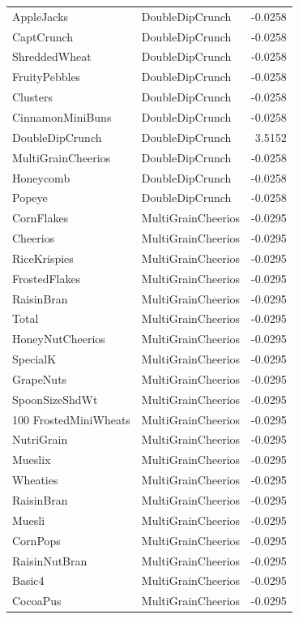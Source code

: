 \begin{longtable}{llr}
AppleJacks & DoubleDipCrunch & -0.0258 \\
CaptCrunch & DoubleDipCrunch & -0.0258 \\
ShreddedWheat & DoubleDipCrunch & -0.0258 \\
FruityPebbles & DoubleDipCrunch & -0.0258 \\
Clusters & DoubleDipCrunch & -0.0258 \\
CinnamonMiniBuns & DoubleDipCrunch & -0.0258 \\
DoubleDipCrunch & DoubleDipCrunch & 3.5152 \\
MultiGrainCheerios & DoubleDipCrunch & -0.0258 \\
Honeycomb & DoubleDipCrunch & -0.0258 \\
Popeye & DoubleDipCrunch & -0.0258 \\
CornFlakes & MultiGrainCheerios & -0.0295 \\
Cheerios & MultiGrainCheerios & -0.0295 \\
RiceKrispies & MultiGrainCheerios & -0.0295 \\
FrostedFlakes & MultiGrainCheerios & -0.0295 \\
RaisinBran & MultiGrainCheerios & -0.0295 \\
Total & MultiGrainCheerios & -0.0295 \\
HoneyNutCheerios & MultiGrainCheerios & -0.0295 \\
SpecialK & MultiGrainCheerios & -0.0295 \\
GrapeNuts & MultiGrainCheerios & -0.0295 \\
SpoonSizeShdWt & MultiGrainCheerios & -0.0295 \\
100%
FrostedMiniWheats & MultiGrainCheerios & -0.0295 \\
NutriGrain & MultiGrainCheerios & -0.0295 \\
Mueslix & MultiGrainCheerios & -0.0295 \\
Wheaties & MultiGrainCheerios & -0.0295 \\
RaisinBran & MultiGrainCheerios & -0.0295 \\
Muesli & MultiGrainCheerios & -0.0295 \\
CornPops & MultiGrainCheerios & -0.0295 \\
RaisinNutBran & MultiGrainCheerios & -0.0295 \\
Basic4 & MultiGrainCheerios & -0.0295 \\
CocoaPus & MultiGrainCheerios & -0.0295 \\

\end{longtable}
